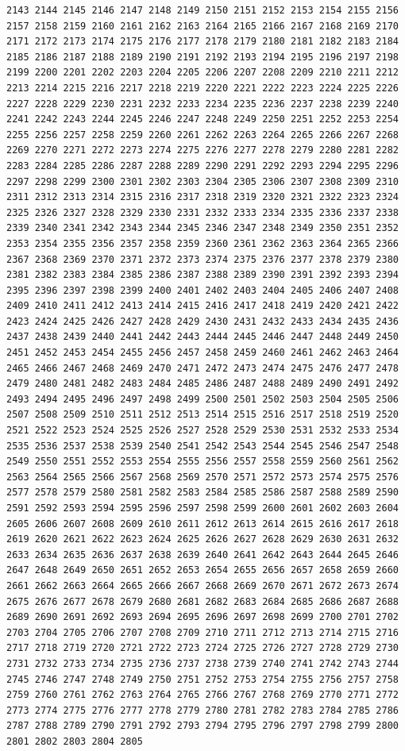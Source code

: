 \documentclass[11pt,]{article}
\begin{document}
\begin{verbatim}
2143 2144 2145 2146 2147 2148 2149 2150 2151 2152 2153 2154 2155 2156 2157 2158 2159 2160 2161 2162 2163 2164 2165 2166 2167 2168 2169 2170 2171 2172 2173 2174 2175 2176 2177 2178 2179 2180 2181 2182 2183 2184 2185 2186 2187 2188 2189 2190 2191 2192 2193 2194 2195 2196 2197 2198 2199 2200 2201 2202 2203 2204 2205 2206 2207 2208 2209 2210 2211 2212 2213 2214 2215 2216 2217 2218 2219 2220 2221 2222 2223 2224 2225 2226 2227 2228 2229 2230 2231 2232 2233 2234 2235 2236 2237 2238 2239 2240 2241 2242 2243 2244 2245 2246 2247 2248 2249 2250 2251 2252 2253 2254 2255 2256 2257 2258 2259 2260 2261 2262 2263 2264 2265 2266 2267 2268 2269 2270 2271 2272 2273 2274 2275 2276 2277 2278 2279 2280 2281 2282 2283 2284 2285 2286 2287 2288 2289 2290 2291 2292 2293 2294 2295 2296 2297 2298 2299 2300 2301 2302 2303 2304 2305 2306 2307 2308 2309 2310 2311 2312 2313 2314 2315 2316 2317 2318 2319 2320 2321 2322 2323 2324 2325 2326 2327 2328 2329 2330 2331 2332 2333 2334 2335 2336 2337 2338 2339 2340 2341 2342 2343 2344 2345 2346 2347 2348 2349 2350 2351 2352 2353 2354 2355 2356 2357 2358 2359 2360 2361 2362 2363 2364 2365 2366 2367 2368 2369 2370 2371 2372 2373 2374 2375 2376 2377 2378 2379 2380 2381 2382 2383 2384 2385 2386 2387 2388 2389 2390 2391 2392 2393 2394 2395 2396 2397 2398 2399 2400 2401 2402 2403 2404 2405 2406 2407 2408 2409 2410 2411 2412 2413 2414 2415 2416 2417 2418 2419 2420 2421 2422 2423 2424 2425 2426 2427 2428 2429 2430 2431 2432 2433 2434 2435 2436 2437 2438 2439 2440 2441 2442 2443 2444 2445 2446 2447 2448 2449 2450 2451 2452 2453 2454 2455 2456 2457 2458 2459 2460 2461 2462 2463 2464 2465 2466 2467 2468 2469 2470 2471 2472 2473 2474 2475 2476 2477 2478 2479 2480 2481 2482 2483 2484 2485 2486 2487 2488 2489 2490 2491 2492 2493 2494 2495 2496 2497 2498 2499 2500 2501 2502 2503 2504 2505 2506 2507 2508 2509 2510 2511 2512 2513 2514 2515 2516 2517 2518 2519 2520 2521 2522 2523 2524 2525 2526 2527 2528 2529 2530 2531 2532 2533 2534 2535 2536 2537 2538 2539 2540 2541 2542 2543 2544 2545 2546 2547 2548 2549 2550 2551 2552 2553 2554 2555 2556 2557 2558 2559 2560 2561 2562 2563 2564 2565 2566 2567 2568 2569 2570 2571 2572 2573 2574 2575 2576 2577 2578 2579 2580 2581 2582 2583 2584 2585 2586 2587 2588 2589 2590 2591 2592 2593 2594 2595 2596 2597 2598 2599 2600 2601 2602 2603 2604 2605 2606 2607 2608 2609 2610 2611 2612 2613 2614 2615 2616 2617 2618 2619 2620 2621 2622 2623 2624 2625 2626 2627 2628 2629 2630 2631 2632 2633 2634 2635 2636 2637 2638 2639 2640 2641 2642 2643 2644 2645 2646 2647 2648 2649 2650 2651 2652 2653 2654 2655 2656 2657 2658 2659 2660 2661 2662 2663 2664 2665 2666 2667 2668 2669 2670 2671 2672 2673 2674 2675 2676 2677 2678 2679 2680 2681 2682 2683 2684 2685 2686 2687 2688 2689 2690 2691 2692 2693 2694 2695 2696 2697 2698 2699 2700 2701 2702 2703 2704 2705 2706 2707 2708 2709 2710 2711 2712 2713 2714 2715 2716 2717 2718 2719 2720 2721 2722 2723 2724 2725 2726 2727 2728 2729 2730 2731 2732 2733 2734 2735 2736 2737 2738 2739 2740 2741 2742 2743 2744 2745 2746 2747 2748 2749 2750 2751 2752 2753 2754 2755 2756 2757 2758 2759 2760 2761 2762 2763 2764 2765 2766 2767 2768 2769 2770 2771 2772 2773 2774 2775 2776 2777 2778 2779 2780 2781 2782 2783 2784 2785 2786 2787 2788 2789 2790 2791 2792 2793 2794 2795 2796 2797 2798 2799 2800 2801 2802 2803 2804 2805 
\end{verbatim}
\end{document}
